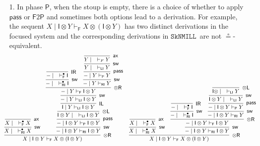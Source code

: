 \documentclass[copyright,creativecommons]{eptcs}
\theoremstyle{definition}
\newcommand{\tl}{\otimes \mathsf{L}}
\newcommand{\tr}{\otimes \mathsf{R}}
\newcommand{\pass}{\mathsf{pass}}
\newcommand{\unitl}{\mathsf{IL}}
\newcommand{\unitr}{\mathsf{IR}}
\newcommand{\ax}{\mathsf{ax}}
\newcommand{\ot}{\otimes}
\newcommand{\I}{\mathsf{I}}
\newcommand{\RI}{\mathsf{RI}}
\newcommand{\LI}{\mathsf{LI}}
\newcommand{\Pass}{\mathsf{P}}
\newcommand{\F}{\mathsf{F}}
\newcommand{\SkNMILL}{$\mathtt{SkNMILL}$}
\begin{document}
\begin{enumerate}
  \item[1.] In phase $\Pass$, when the stoup is empty, there is a choice of whether to apply $\pass$ or $\F2\Pass$ and sometimes both options lead to a derivation. For example, the sequent $X \mid \I \ot Y \vdash_{\F} X \ot (\I \ot Y)$ has two distinct derivations in the focused system and the corresponding derivations in \SkNMILL\ are not $\circeq$-equivalent.
  \begin{equation*}
  \small
\hspace*{-5mm}
    \begin{array}{cc}
    \infer[\tr]{X \mid \I \ot Y \vdash_{\F} X \ot (\I \ot Y)}{
    \infer[\mathsf{sw}]{X \mid \quad \vdash^{\bullet}_{\RI} X}{
      \infer[\ax]{X \mid \quad \vdash_{\F}^\bullet X}{}
    }
      &
      \infer[\mathsf{sw}]{{-} \mid \I \ot Y \vdash_{\RI} \I \ot Y}{
        \infer[\pass]{{-} \mid \I \ot Y \vdash_{\Pass} \I \ot Y}{
          \infer[\tl]{\I \ot Y \mid \quad \vdash_{\LI} \I \ot Y}{
            \infer[\unitl]{\I \mid Y \vdash_{\LI} \I \ot Y}{
              \infer[\mathsf{sw}]{{-} \mid Y \vdash_{\LI} \I \ot Y}{
                \infer[\tr]{{-} \mid Y \vdash_{\F} \I \ot Y}{
                  \infer[\mathsf{sw}]{{-} \mid \quad \vdash^{\bullet}_{\RI} \I}{
                    \infer[\unitr]{{-} \mid \quad \vdash_{\F}^\bullet \I}{}
                  }
                  &
                  \infer[\mathsf{sw}]{{-} \mid Y \vdash_{\RI} Y}{
                    \infer[\pass]{{-} \mid Y \vdash_{\Pass} Y}{
                      \infer[\mathsf{sw}]{Y \mid \quad \vdash_{\LI} Y}{
                        \infer[\ax]{Y \mid \quad \vdash_{F} Y}{}
                      }
                    }
                  }
                }
              }
            }
          }
        }
      }
    }
    &
    \infer[\tr]{X \mid \I \ot Y \vdash_{\F} X \ot (\I \ot Y)}{
      \infer[\mathsf{sw}]{X \mid \quad \vdash^{\bullet}_{\RI} X}{
        \infer[\ax]{X \mid \quad \vdash_{\F}^\bullet X}{}
      }
      &
      \infer[\mathsf{sw}]{{-} \mid \I \ot Y \vdash_{\RI} \I \ot Y}{
        \infer[\tr]{{-} \mid \I \ot Y \vdash_{\F} \I \ot Y}{
          \infer[\mathsf{sw}]{{-} \mid \quad \vdash^{\bullet}_{\RI} \I}{
            \infer[\unitr]{{-} \mid \quad \vdash_{\F}^\bullet \I}{}
          }
          &
          \infer[\mathsf{sw}]{{-} \mid \I \ot Y \vdash_{\RI} Y}{
            \infer[\pass]{{-} \mid \I \ot Y \vdash_{\Pass} Y}{
              \infer[\mathsf{sw}]{\I \ot Y \mid \quad \vdash_{\LI} Y}{
                \infer[\tl]{\I \ot \mid \quad \vdash_{\LI} Y}{
}}}}}}}
\end{array}
\end{equation*}
\end{enumerate}
\end{document}
